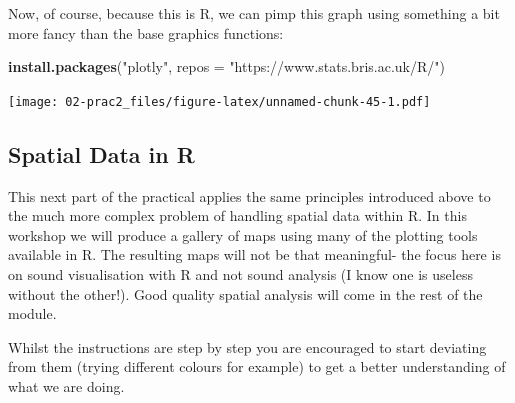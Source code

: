 \documentclass[]{book}
\newenvironment{Shaded}{\begin{snugshade}}{\end{snugshade}}
\newcommand{\DataTypeTok}[1]{\textcolor[rgb]{0.13,0.29,0.53}{#1}}
\newcommand{\DecValTok}[1]{\textcolor[rgb]{0.00,0.00,0.81}{#1}}
\newcommand{\FloatTok}[1]{\textcolor[rgb]{0.00,0.00,0.81}{#1}}
\newcommand{\KeywordTok}[1]{\textcolor[rgb]{0.13,0.29,0.53}{\textbf{#1}}}
\newcommand{\NormalTok}[1]{#1}
\newcommand{\OperatorTok}[1]{\textcolor[rgb]{0.81,0.36,0.00}{\textbf{#1}}}
\newcommand{\StringTok}[1]{\textcolor[rgb]{0.31,0.60,0.02}{#1}}
\begin{document}
Now, of course, because this is R, we can pimp this graph using something a bit more fancy than the base graphics functions:

\begin{Shaded}
\begin{Highlighting}[]
\KeywordTok{install.packages}\NormalTok{(}\StringTok{"plotly"}\NormalTok{, }\DataTypeTok{repos =} \StringTok{"https://www.stats.bris.ac.uk/R/"}\NormalTok{)}
\end{Highlighting}
\end{Shaded}

\begin{Shaded}
\end{Shaded}

\texttt{[image: 02-prac2\_files/figure-latex/unnamed-chunk-45-1.pdf]}

\hypertarget{spatial-data-in-r}{%
\subsection{Spatial Data in R}\label{spatial-data-in-r}}

This next part of the practical applies the same principles introduced above to the much more complex problem of handling spatial data within R. In this workshop we will produce a gallery of maps using many of the plotting tools available in R. The resulting maps will not be that meaningful- the focus here is on sound visualisation with R and not sound analysis (I know one is useless without the other!). Good quality spatial analysis will come in the rest of the module.

Whilst the instructions are step by step you are encouraged to start deviating from them (trying different colours for example) to get a better understanding of what we are doing.
\end{document}
